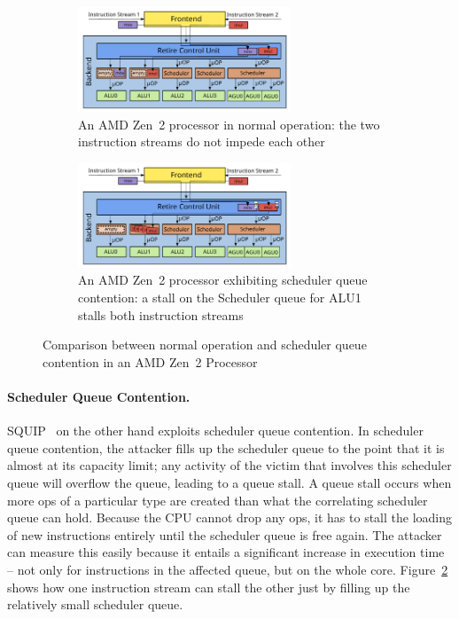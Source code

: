 \documentclass[11pt,
  titlepage=false,
  parskip=half,      %
]{scrreprt}
\begin{document}
\begin{figure}
    \begin{subfigure}[b]{\textwidth}
        \centering
        \includegraphics[width=0.7\textwidth]{figures/Zen2 normal operation}
        \caption{An AMD Zen~2 processor in normal operation: the two instruction streams do not impede each other}
        \label{fig:amdzen2normaloperation}
    \end{subfigure}

    \begin{subfigure}[b]{\textwidth}
        \centering
        \includegraphics[width=0.7\textwidth]{figures/Zen2 sqc}
        \caption{An AMD Zen~2 processor exhibiting scheduler queue contention: a stall on the Scheduler queue for ALU1 stalls both instruction streams}
        \label{fig:amdzen2sqc}
    \end{subfigure}

    \caption{Comparison between normal operation and scheduler queue contention in an AMD Zen~2 Processor}
    \label{fig:amdzen2normalvssqc}
\end{figure}

\paragraph{Scheduler Queue Contention.}
SQUIP~\cite{squip} on the other hand exploits scheduler queue contention.
In scheduler queue contention, the attacker fills up the scheduler queue to the point that it is almost at its capacity limit;
any activity of the victim that involves this scheduler queue will overflow the queue, leading to a queue stall.
A queue stall occurs when more \textmu ops of a particular type are created than what the correlating scheduler queue can hold.
Because the CPU cannot drop any \textmu ops, it has to stall the loading of new instructions entirely until the scheduler queue is free again.
The attacker can measure this easily because it entails a significant increase in execution time --
not only for instructions in the affected queue, but on the whole core.
Figure~\ref{fig:amdzen2sqc} shows how one instruction stream can stall the other just by filling up the relatively small scheduler queue.
\end{document}
